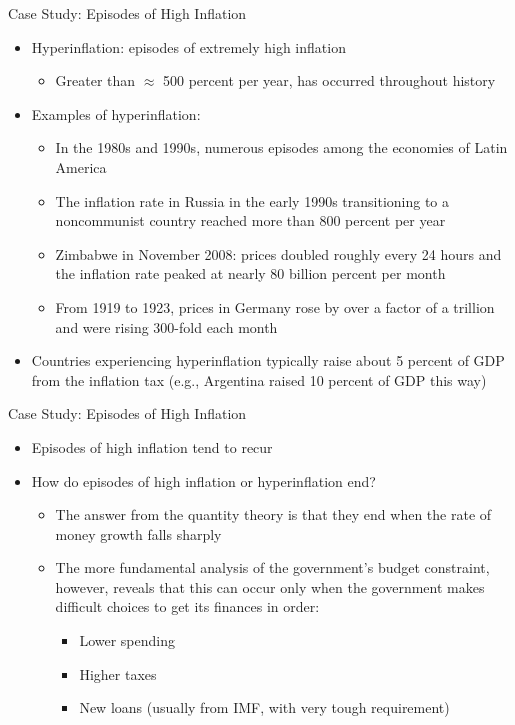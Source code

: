 \documentclass[aspectratio=1610]{beamer}
\begin{document}
\begin{frame}[wide]{Case Study: Episodes of High Inflation}
	\begin{itemize}
		\item Hyperinflation: episodes of extremely high inflation
		\begin{itemize}
			\item Greater than $\approx$ 500 percent per year, has occurred throughout history
		\end{itemize}
		\item Examples of hyperinflation:
		\begin{itemize}
			\item In the 1980s and 1990s, numerous episodes among the economies of Latin America
		\item The inflation rate in Russia in the early 1990s transitioning to a noncommunist country reached more than 800 percent per year
		\item Zimbabwe in November 2008: prices doubled roughly every 24 hours and the inflation rate peaked at nearly 80 billion percent per month
		\item From 1919 to 1923, prices in Germany rose by over a factor of a trillion and were rising 300-fold each month
		\end{itemize}
		\item Countries experiencing hyperinflation typically raise about 5 percent of GDP from the inflation tax (e.g., Argentina raised 10 percent of GDP this way)
	\end{itemize}
\end{frame}

\begin{frame}[wide]{Case Study: Episodes of High Inflation}
	\begin{itemize}
		\item Episodes of high inflation tend to recur
		\item How do episodes of high inflation or hyperinflation end? 
		\begin{itemize}
			\item The answer from the quantity theory is that they end when the rate of money growth falls sharply
			\item The more fundamental analysis of the government’s budget constraint, however, reveals that this can occur only when the government makes difficult choices to get its finances in order: 
			\begin{itemize}
				\item Lower spending
				\item Higher taxes
				\item New loans (usually from IMF, with very tough requirement)
			\end{itemize}
		\end{itemize}
	\end{itemize}
\end{frame}
\end{document}
